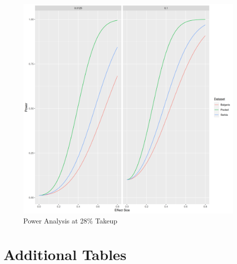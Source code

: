 \documentclass{article}
\begin{document}
\begin{figure}
  \includegraphics[width=\textwidth]{plots/Power Calculations.png}
  \caption{Power Analysis at 28\% Takeup}
  \label{fig:Power Analysis}
\end{figure}




\section{Additional Tables}











\end{document}
